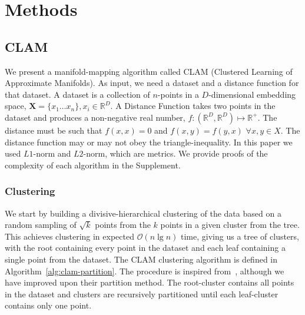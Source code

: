 \section{Methods}
\label{sec:methods}


\subsection{CLAM}
\label{subsec:methods:clam}

We present a manifold-mapping algorithm called CLAM (Clustered Learning of Approximate Manifolds).
As input, we need a dataset and a distance function for that dataset.
A dataset is a collection of $n$-points in a $D$-dimensional embedding space, $\textbf{X} = \{x_1 \dots x_n\}, x_i \in \mathbb{R}^D$.
A Distance Function takes two points in the dataset and produces a non-negative real number, $f : (\mathbb{R}^D, \mathbb{R}^D) \mapsto \mathbb{R}^+$.
The distance must be such that $f(x, x) = 0$ and $f(x, y) = f(y, x)$ $\forall x, y \in X$.
The distance function may or may not obey the triangle-inequality.
In this paper we used $L1$-norm and $L2$-norm, which are metrics.
We provide proofs of the complexity of each algorithm in the Supplement.

\subsubsection{Clustering}
\label{subsubsec:methods:clam:clustering}

We start by building a divisive-hierarchical clustering of the data based on a random sampling of $\sqrt k$ points from the  $k$ points in a given cluster from the tree.
This achieves clustering in expected $\mathcal{O}(n \lg n)$ time, giving us a tree of clusters, with the root containing every point in the dataset and each leaf containing a single point from the dataset.
The CLAM clustering algorithm is defined in Algorithm~\ref{alg:clam-partition}.
The procedure is inspired from~\cite{ishaq2019clustered}, although we have improved upon their partition method.
The root-cluster contains all points in the dataset and clusters are recursively partitioned until each leaf-cluster contains only one point.

